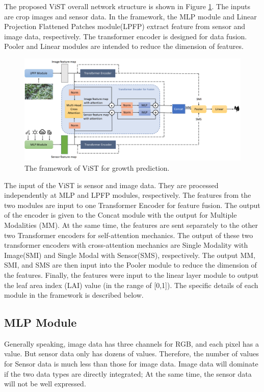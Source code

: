 \documentclass[acmsmall,manuscript, screen, review]{acmart}
\begin{document}
The proposed ViST overall network structure is shown in Figure \ref{model_structure}. The inputs are crop images and sensor data. In the framework, the MLP module and Linear Projection Flattened Patches module(LPFP) extract feature from sensor and image data, respectively. The transformer encoder is designed for data fusion. Pooler and Linear modules are intended to reduce the dimension of features.

\begin{figure}[htbp]
  \centering
  \includegraphics[width=\linewidth]{pic/model_structure.png}
  \caption{The framework of ViST for growth prediction.}
  \label{model_structure}
\end{figure}
The input of the ViST is sensor and image data. They are processed independently at MLP and LPFP modules, respectively. The features from the two modules are input to one Transformer Encoder for feature fusion. The output of the encoder is given to the Concat module with the output for Multiple Modalities (MM). At the same time, the features are sent separately to the other two Transformer encoders for self-attention mechanics. The output of these two transformer encoders with cross-attention mechanics are Single Modality with Image(SMI) and Single Modal with Sensor(SMS), respectively. The output MM, SMI, and SMS are then input into the Pooler module to reduce the dimension of the features. Finally, the features were input to the linear layer module to output the leaf area index (LAI) value (in the range of [0,1]). The specific details of each module in the framework is described below.



\subsection{MLP Module}
Generally speaking, image data has three channels for RGB, and each pixel has a value. But sensor data only has dozens of values. Therefore, the number of values for Sensor data is much less than those for image data. Image data will dominate if the two data types are directly integrated; At the same time, the sensor data will not be well expressed.
\end{document}
